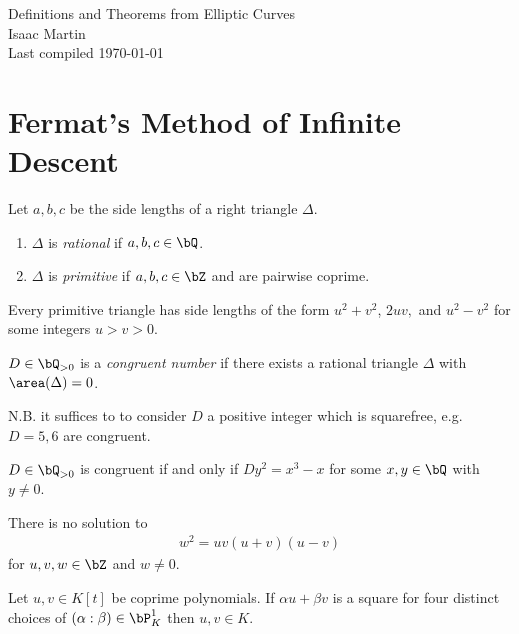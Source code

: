 


\begin{center}
	\LARGE
	Definitions and Theorems from Elliptic Curves\\
	\Large
	Isaac Martin \\
    Last compiled \today
\end{center}
\normalsize
\vspace{-2mm}
\hru

\tableofcontents
\newpage

\section{Fermat's Method of Infinite Descent}
\begin{defn}\label{defn:triangle-definitions}
Let $a,b,c$ be the side lengths of a right triangle $\Delta$.
	\begin{enumerate}
		\item $\Delta$ is \emph{rational} if $a,b,c \in \bQ$.
		\item $\Delta$ is \emph{primitive} if $a,b,c \in \bZ$ and are pairwise coprime.
	\end{enumerate}
\end{defn}

\begin{lem}[Lemma 1.1]\label{lem:form-for-prim-triangles}
	Every primitive triangle has side lengths of the form $u^2+v^2$, $2uv,$ and $u^2 - v^2$ for some integers $u > v > 0$.
\end{lem}
\begin{defn}\label{defn:congruent-number}
	$D\in \bQ_{>0}$ is a \emph{congruent number} if there exists a rational triangle $\Delta$ with $\area(\Delta) = 0$. 
\end{defn}
N.B. it suffices to to consider $D$ a positive integer which is squarefree, e.g. $D = 5, 6$ are congruent.

\begin{lem}[Lemma 1.2]\label{lem:congruent-number-condition}
	$D \in \bQ_{>0}$ is congruent if and only if $Dy^{2}=x^3 - x$ for some $x,y \in \bQ$ with $y \neq 0$.
\end{lem}

\begin{thm}
	There is no solution to 
	\begin{align*}
		w^2 = uv(u+v)(u-v)
	\end{align*}
	for $u,v,w \in \bZ$ and $w \neq 0$.
\end{thm}
\begin{lem}\label{lem:fermat-uni-descent-polynomials}
	Let $u, v \in K[t]$ be coprime polynomials. If $\alpha u + \beta v$ is a square for four distinct choices of $(\alpha:\beta) \in \bP^1_K$ then $u,v \in K$. 
\end{lem}

